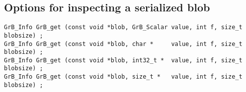 
\newpage
\subsection{Options for inspecting a serialized blob}
\label{get_set_blob}

\begin{mdframed}[userdefinedwidth=6.5in]
{\footnotesize
\begin{verbatim}
GrB_Info GrB_get (const void *blob, GrB_Scalar value, int f, size_t blobsize) ;
GrB_Info GrB_get (const void *blob, char *     value, int f, size_t blobsize) ;
GrB_Info GrB_get (const void *blob, int32_t *  value, int f, size_t blobsize) ;
GrB_Info GrB_get (const void *blob, size_t *   value, int f, size_t blobsize) ;
\end{verbatim}
}\end{mdframed}

